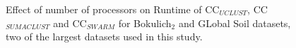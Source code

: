 \documentclass[10pt, conference, compsocconf]{IEEEtran}
\begin{document}
\begin{figure}[t]	
	\begin{minipage}[t]{0.5\linewidth}
	\end{minipage}%
	\hfill%
	\begin{minipage}[t]{0.5\linewidth}
	\end{minipage}	
	\caption{Effect of number of processors on Runtime of CC$_{UCLUST}$, CC$_{SUMACLUST}$ and CC$_{SWARM}$ for Bokulich$_2$ and GLobal Soil datasets, two of the largest datasets used in this study.}
\end{figure}
\end{document}
